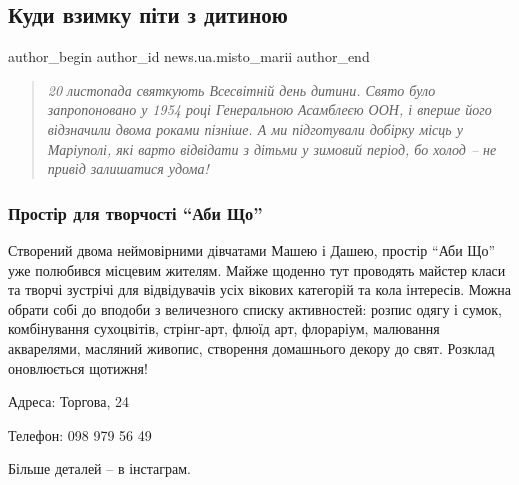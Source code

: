  
 
 
 
 
 
\subsection{Куди взимку піти з дитиною}
\label{sec:20_11_2021.stz.news.ua.misto_marii.1.kudy_vzymku_pity_z_dytynoju}
 
\ifcmt
 author_begin
   author_id news.ua.misto_marii
 author_end
\fi

\begin{quote}
\em
20 листопада святкують Всесвітній день дитини. Свято було запропоновано у
1954 році Генеральною Асамблеєю ООН, і вперше його відзначили двома роками
пізніше. А ми підготували добірку місць у Маріуполі, які варто відвідати з
дітьми у зимовий період, бо холод – не привід залишатися удома!
\end{quote}

\subsubsection{Простір для творчості \enquote{Аби Що}}

Створений двома неймовірними дівчатами Машею і Дашею, простір \enquote{Аби Що} уже
полюбився місцевим жителям. Майже щоденно тут проводять майстер класи та творчі
зустрічі для відвідувачів усіх вікових категорій та кола інтересів. Можна
обрати собі до вподоби з величезного списку активностей: розпис одягу і сумок,
комбінування сухоцвітів, стрінг-арт, флюїд арт, флораріум, малювання
акварелями, масляний живопис, створення домашнього декору до свят. Розклад
оновлюється щотижня!

Адреса: Торгова, 24

Телефон: 098 979 56 49

Більше деталей – в інстаграм.


